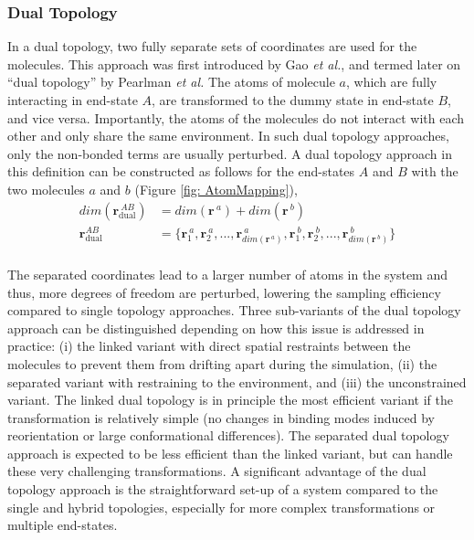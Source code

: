 \subsubsection{Dual Topology}
In a dual topology, two fully separate sets of coordinates are used for the molecules. This approach was first introduced by Gao \textit{et al.},\cite{Gao1989} and termed later on ``dual topology'' by Pearlman \textit{et al.}\cite{Pearlman1991} The atoms of molecule $a$, which are fully interacting in end-state $A$, are transformed to the dummy state in end-state $B$, and vice versa. Importantly, the atoms of the molecules do not interact with each other and only share the same environment.\cite{Riniker2011, Rocklin2013} In such dual topology approaches, only the non-bonded terms are usually perturbed.\cite{Riniker2011, Sidler2016, Boresch1999, Michel2010}
%
A dual topology approach in this definition can be constructed as follows for the end-states $A$ and $B$ with the two molecules $a$ and $b$ (Figure \ref{fig: AtomMapping}),
\begin{align*}
    dim(\textbf{r}_{\text{dual}}^{~AB}) &= dim(\textbf{r}^{~a}) + dim(\textbf{r}^{~b})\\
    \textbf{r}^{AB}_{\text{dual}} &= \{\textbf{r}^{~a}_{1}, \textbf{r}^{~a}_{2}, ..., \textbf{r}^{~a}_{dim(\textbf{r}^{~a})}, \textbf{r}^{~b}_{1}, \textbf{r}^{~b}_{2}, ..., \textbf{r}^{~b}_{dim(\textbf{r}^{~b})}\}\\
\end{align*}

The separated coordinates lead to a larger number of atoms in the system and thus, more degrees of freedom are perturbed, lowering the sampling efficiency compared to single topology approaches. 
Three sub-variants of the dual topology approach can be distinguished depending on how this issue is addressed in practice:
(i) the linked variant with direct spatial restraints between the molecules to prevent them from drifting apart during the simulation,\cite{Riniker2011, Sidler2016, Christ2009A, Jespers2019} (ii) the separated variant with restraining to the environment,\cite{Mobley2006, Rocklin2013} and (iii) the unconstrained variant.\cite{Henine2004, Carvalho2021}
The linked dual topology is in principle the most efficient variant if the transformation is relatively simple (no changes in binding modes induced by reorientation or large conformational differences). The separated dual topology approach is expected to be less efficient than the linked variant, but can handle these very challenging transformations.\cite{Mobley2006}
A significant advantage of the dual topology approach is the straightforward set-up of a system compared to the single and hybrid topologies, especially for more complex transformations or multiple end-states.

